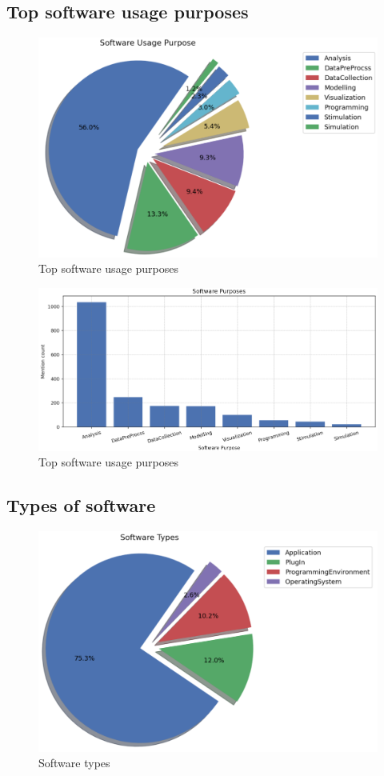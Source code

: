 \subsection{Top software usage purposes}
\label{subsec:dataset:Analysis:topsoftwareusage}

\begin{figure}[htbp]
	\centering
	\includegraphics[width=.65\textwidth]{4.graphics/figures/analysisresults/2.Software Usage Purpose pie}
	\caption{Top software usage purposes}
	\label{fig:chapter03:setup}
\end{figure}

\begin{figure}[htbp]
	\centering
	\includegraphics[width=1\textwidth]{4.graphics/figures/analysisresults/3.Software Purposes}
	\caption{Top software usage purposes}
	\label{fig:chapter03:setup}
\end{figure}


\subsection{Types of software}
\label{subsec:dataset:Analysis:topsoftwareTypes}

\begin{figure}[htbp]
	\centering
	\includegraphics[width=.65\textwidth]{4.graphics/figures/analysisresults/4.Software Types pie}
	\caption{Software types}
	\label{fig:chapter03:setup}
\end{figure}

